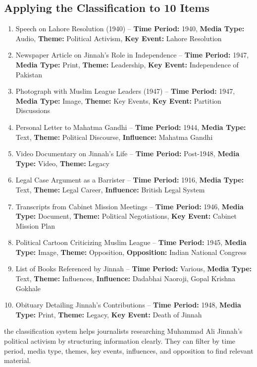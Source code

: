 \documentclass[a4paper]{exam}
\begin{document}
\begin{questions}
\section*{Applying the Classification to 10 Items}
\begin{enumerate}
    \item {Speech on Lahore Resolution (1940) – \textbf{Time Period:} 1940, \textbf{Media Type:} Audio, \textbf{Theme:} Political Activism, \textbf{Key Event:} Lahore Resolution}
    \item {Newspaper Article on Jinnah's Role in Independence – \textbf{Time Period:} 1947, \textbf{Media Type:} Print, \textbf{Theme:} Leadership, \textbf{Key Event:} Independence of Pakistan}
    \item {Photograph with Muslim League Leaders (1947) – \textbf{Time Period:} 1947, \textbf{Media Type:} Image, \textbf{Theme:} Key Events, \textbf{Key Event:} Partition Discussions}
    \item {Personal Letter to Mahatma Gandhi – \textbf{Time Period:} 1944, \textbf{Media Type:} Text, \textbf{Theme:} Political Discourse, \textbf{Influence:} Mahatma Gandhi}
    \item {Video Documentary on Jinnah's Life – \textbf{Time Period:} Post-1948, \textbf{Media Type:} Video, \textbf{Theme:} Legacy}
    \item {Legal Case Argument as a Barrister – \textbf{Time Period:} 1916, \textbf{Media Type:} Text, \textbf{Theme:} Legal Career, \textbf{Influence:} British Legal System}
    \item {Transcripts from Cabinet Mission Meetings – \textbf{Time Period:} 1946, \textbf{Media Type:} Document, \textbf{Theme:} Political Negotiations, \textbf{Key Event:} Cabinet Mission Plan}
    \item {Political Cartoon Criticizing Muslim League – \textbf{Time Period:} 1945, \textbf{Media Type:} Image, \textbf{Theme:} Opposition, \textbf{Opposition:} Indian National Congress}
    \item {List of Books Referenced by Jinnah – \textbf{Time Period:} Various, \textbf{Media Type:} Text, \textbf{Theme:} Influences, \textbf{Influence:} Dadabhai Naoroji, Gopal Krishna Gokhale}
    \item {Obituary Detailing Jinnah’s Contributions – \textbf{Time Period:} 1948, \textbf{Media Type:} Print, \textbf{Theme:} Legacy, \textbf{Key Event:} Death of Jinnah}
\end{enumerate}


the classification system helps journalists researching Muhammad Ali Jinnah’s political activism by structuring information clearly. They can filter by time period, media type, themes, key events, influences, and opposition to find relevant material.



\end{questions}
\end{document}

